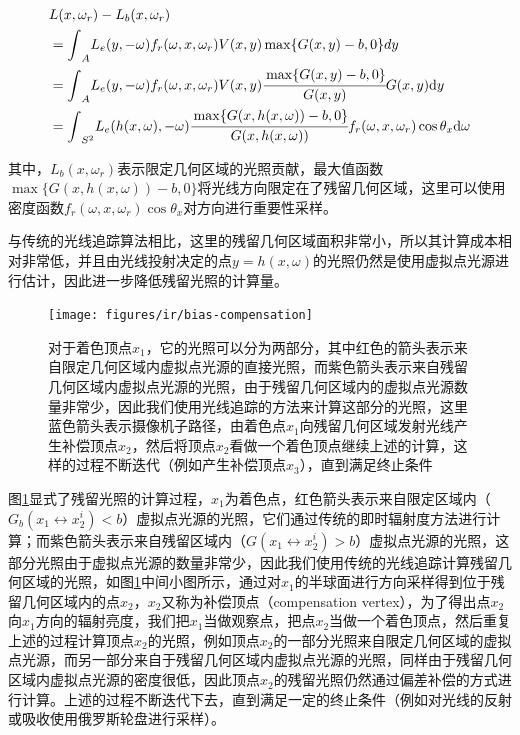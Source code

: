 \begin{equation}
\begin{aligned}
	&L(x,\omega_r)-L_b(x,\omega_r)\\
	&={\rm \int}_AL_e(y,-\omega)f_r(\omega,x,\omega_r)V(x,y)\max\{G(x,y)-b,0\}dy\\
	&={\rm \int}_AL_e(y,-\omega)f_r(\omega,x,\omega_r)V(x,y) \cfrac{\max\{G(x,y)-b,0\}}{G(x,y)}G(x,y) {\rm d}y\\
	&={\rm \int}_{S^{2}}L_e(h(x,\omega),-\omega) \cfrac{\max\{G(x,h(x,\omega))-b,0\}}{G(x,h(x,\omega))}f_r(\omega,x,\omega_r)\cos\theta_x {\rm d}\omega
\end{aligned}
\end{equation}

\noindent 其中，$L_b(x,\omega_r)$表示限定几何区域的光照贡献，最大值函数$\max\{G(x,h(x,\omega))-b,0\}$将光线方向限定在了残留几何区域，这里可以使用密度函数$f_r(\omega,x,\omega_r)\cos\theta_x$对方向进行重要性采样。

与传统的光线追踪算法相比，这里的残留几何区域面积非常小，所以其计算成本相对非常低，并且由光线投射决定的点$y=h(x,\omega)$的光照仍然是使用虚拟点光源进行估计，因此进一步降低残留光照的计算量。

\begin{figure}
\begin{fullwidth}
	\texttt{[image: figures/ir/bias-compensation]}
	\caption{对于着色顶点$x_1$，它的光照可以分为两部分，其中红色的箭头表示来自限定几何区域内虚拟点光源的直接光照，而紫色箭头表示来自残留几何区域内虚拟点光源的光照，由于残留几何区域内的虚拟点光源数量非常少，因此我们使用光线追踪的方法来计算这部分的光照，这里蓝色箭头表示摄像机子路径，由着色点$x_1$向残留几何区域发射光线产生补偿顶点$x_2$，然后将顶点$x_2$看做一个着色顶点继续上述的计算，这样的过程不断迭代（例如产生补偿顶点$x_3$），直到满足终止条件}
	\label{f:ir-bias-compensation}
\end{fullwidth}
\end{figure}

图\ref{f:ir-bias-compensation}显式了残留光照的计算过程，$x_1$为着色点，红色箭头表示来自限定区域内（$G_b(x_1\leftrightarrow x^{i}_2)<b$）虚拟点光源的光照，它们通过传统的即时辐射度方法进行计算；而紫色箭头表示来自残留区域内（$G(x_1\leftrightarrow x^{i}_2)>b$）虚拟点光源的光照，这部分光照由于虚拟点光源的数量非常少，因此我们使用传统的光线追踪计算残留几何区域的光照，如图\ref{f:ir-bias-compensation}中间小图所示，通过对$x_1$的半球面进行方向采样得到位于残留几何区域内的点$x_2$，$x_2$又称为补偿顶点（compensation vertex），为了得出点$x_2$向$x_1$方向的辐射亮度，我们把$x_1$当做观察点，把点$x_2$当做一个着色顶点，然后重复上述的过程计算顶点$x_2$的光照，例如顶点$x_2$的一部分光照来自限定几何区域的虚拟点光源，而另一部分来自于残留几何区域内虚拟点光源的光照，同样由于残留几何区域内虚拟点光源的密度很低，因此顶点$x_2$的残留光照仍然通过偏差补偿的方式进行计算。上述的过程不断迭代下去，直到满足一定的终止条件（例如对光线的反射或吸收使用俄罗斯轮盘进行采样）。

